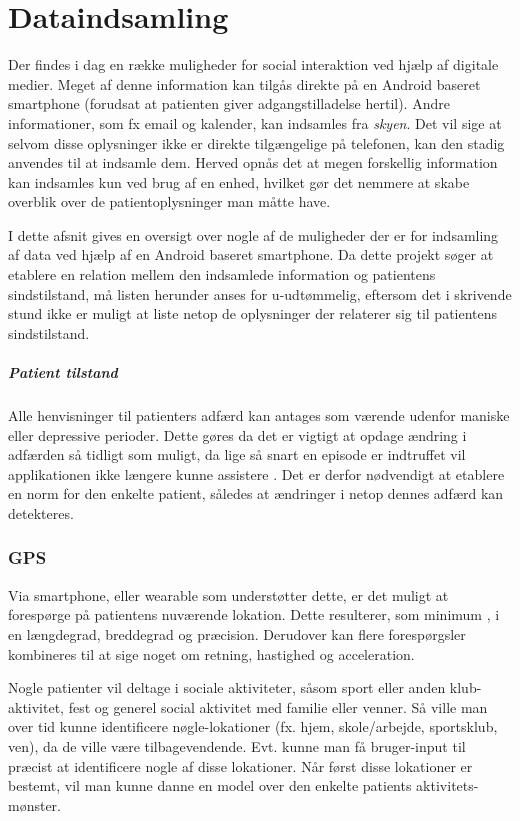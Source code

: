 \chapter{Dataindsamling}
Der findes i dag en række muligheder for social interaktion ved hjælp af digitale medier.
Meget af denne information kan tilgås direkte på en Android baseret smartphone (forudsat at patienten giver adgangstilladelse hertil).
Andre informationer, som fx email og kalender, kan indsamles fra \textit{skyen}.
Det vil sige at selvom disse oplysninger ikke er direkte tilgængelige på telefonen, kan den stadig anvendes til at indsamle dem.
Herved opnås det at megen forskellig information kan indsamles kun ved brug af en enhed, hvilket gør det nemmere at skabe overblik over de patientoplysninger man måtte have.

I dette afsnit gives en oversigt over nogle af de muligheder der er for indsamling af data ved hjælp af en Android baseret smartphone.
Da dette projekt søger at etablere en relation mellem den indsamlede information og patientens sindstilstand, må listen herunder anses for u-udtømmelig, eftersom det i skrivende stund ikke er muligt at liste netop de oplysninger der relaterer sig til patientens sindstilstand.

\paragraph{Patient tilstand}
Alle henvisninger til patienters adfærd kan antages som værende udenfor maniske eller depressive perioder.
Dette gøres da det er vigtigt at opdage ændring i adfærden så tidligt som muligt, da lige så snart en episode er indtruffet vil applikationen ikke længere kunne assistere .
Det er derfor nødvendigt at etablere en norm for den enkelte patient, således at ændringer i netop dennes adfærd kan detekteres.

\subsection{GPS}
Via smartphone, eller wearable som understøtter dette, er det muligt at forespørge på patientens nuværende lokation.
Dette resulterer, som minimum , i en længdegrad, breddegrad og præcision.
Derudover kan flere forespørgsler kombineres til at sige noget om retning, hastighed og acceleration.

Nogle patienter vil deltage i sociale aktiviteter, såsom sport eller anden klub-aktivitet, fest og generel social aktivitet med familie eller venner.
Så ville man over tid kunne identificere nøgle-lokationer (fx. hjem, skole/arbejde, sportsklub, ven), da de ville være tilbagevendende.
Evt. kunne man få bruger-input til præcist at identificere nogle af disse lokationer.
Når først disse lokationer er bestemt, vil man kunne danne en model over den enkelte patients aktivitets-mønster.


